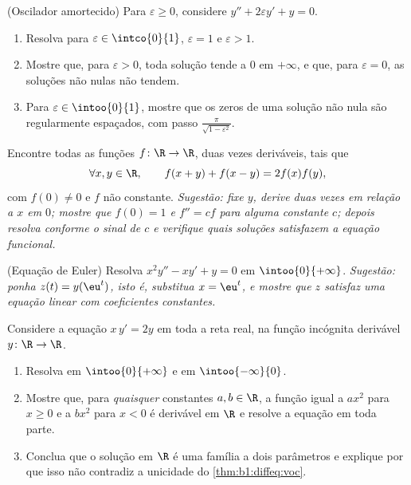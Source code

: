\begin{exercise}[$\star\star\star$]\label{exo:b1:diffeq:9}
(Oscilador amortecido) Para $\varepsilon \geq 0$, considere
$y'' + 2\varepsilon y' + y = 0$.
\begin{enumerate}
  \item Resolva para $\varepsilon \in \intco{0}{1}$, $\varepsilon = 1$
        e $\varepsilon > 1$.
  \item Mostre que, para $\varepsilon > 0$, toda solução tende a $0$
        em $+\infty$, e que, para $\varepsilon = 0$, as soluções não
        nulas não tendem.
  \item Para $\varepsilon \in \intoo{0}{1}$, mostre que os zeros de uma
        solução não nula são regularmente espaçados, com passo
        $\frac{\pi}{\sqrt{1 - \varepsilon^2}}$.
\end{enumerate}
\end{exercise}

\begin{exercise}[$\star\star\star$]\label{exo:b1:diffeq:10}
Encontre todas as funções $f \colon \R \to \R$, duas vezes deriváveis, tais
que
\[
\forall x, y \in \R, \qquad f(x + y) + f(x - y) = 2 f(x) f(y),
\]
com $f(0) \ne 0$ e $f$ não constante.
\emph{Sugestão: fixe $y$, derive duas vezes em relação a $x$ em $0$;
mostre que $f(0) = 1$ e $f'' = c f$ para alguma constante $c$; depois
resolva conforme o sinal de $c$ e verifique quais soluções satisfazem a
equação funcional.}
\end{exercise}

\begin{exercise}[$\star\star$]\label{exo:b1:diffeq:11}
(Equação de Euler) Resolva $x^2 y'' - x y' + y = 0$ em
$\intoo{0}{+\infty}$. \emph{Sugestão: ponha $z(t) = y(\eu^t)$, isto é,
substitua $x = \eu^t$, e mostre que $z$ satisfaz uma equação
linear com coeficientes constantes.}
\end{exercise}

\begin{exercise}[$\star\star\star$]\label{exo:b1:diffeq:12}
Considere a equação $x\,y' = 2y$ em toda a reta real, na
função incógnita derivável $y \colon \R \to \R$.
\begin{enumerate}
  \item Resolva em $\intoo{0}{+\infty}$ e em $\intoo{-\infty}{0}$.
  \item Mostre que, para \emph{quaisquer} constantes $a, b \in \R$, a
        função igual a $ax^2$ para $x \geq 0$ e a $bx^2$ para
        $x < 0$ é derivável em $\R$ e resolve a equação
        em toda parte.
  \item Conclua que o  solução em $\R$ é uma família a dois
        parâmetros e explique por que isso não contradiz a
        unicidade do \cref{thm:b1:diffeq:voc}.
\end{enumerate}
\end{exercise}

